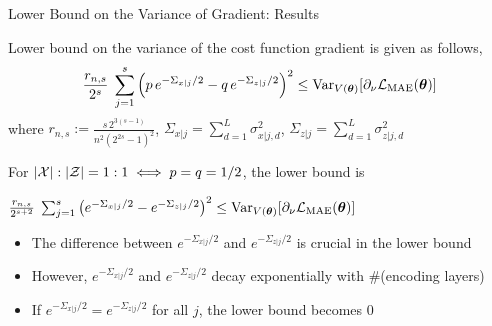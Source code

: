 \documentclass[dvipdfmx,10pt,aspectratio=169]{beamer}
\begin{document}
\begin{frame}{Lower Bound on the Variance of Gradient: Results}
    \begin{theorem}
        Lower bound on the variance of the cost function gradient is given as follows,
        \begin{align*}
            \frac{r_{n,s}}{2^s}\;
            \sum_{j=1}^s \qty(p\,e^{-\Sigma_{x|j}/2} - q\,e^{-\Sigma_{z|j}/2})^2
            \leq \operatorname{Var}_{V(\vb*{\theta})}[\partial_\nu\mathcal{L}_{\mathrm{MAE}}(\vb*{\theta})]
        \end{align*}
        where $r_{n,s} := \frac{s\,2^{3(s-1)}}{n^2(2^{2s}-1)^2}$, $\Sigma_{x|j} = \sum_{d=1}^L \sigma_{x|j,d}^2$, $\Sigma_{z|j} = \sum_{d=1}^L \sigma_{z|j,d}^2$
    \end{theorem}
    
    For $|\mathcal{X}|:|\mathcal{Z}| = 1:1 \iff p = q = 1/2$, the lower bound is
    \begin{center}
        $
        \frac{r_{n,s}}{2^{s+2}}\;
        \sum_{j=1}^s
        \qty(e^{-\Sigma_{x|j}/2}- e^{-\Sigma_{z|j}/2})^2
        \leq \operatorname{Var}_{V(\vb*{\theta})}[\partial_\nu\mathcal{L}_{\mathrm{MAE}}(\vb*{\theta})]
        $
    \end{center}

    \begin{itemize}
        \item The difference between $e^{-\Sigma_{x|j}/2}$ and $e^{-\Sigma_{z|j}/2}$ is crucial in the lower bound
        \item However, $e^{-\Sigma_{x|j}/2}$ and $e^{-\Sigma_{z|j}/2}$ decay exponentially with \#(encoding layers)
        \item If $e^{-\Sigma_{x|j}/2} = e^{-\Sigma_{z|j}/2}$ for all $j$, the lower bound becomes $0$
    \end{itemize}
\end{frame}
\end{document}
